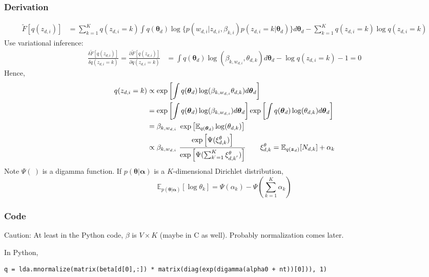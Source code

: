 \documentclass[a4paper,10.5pt,dvipdfmx]{jarticle}  %
\begin{document}
\subsubsection{Derivation}
\begin{align}
	\widetilde{F}[q(z_{d,i})] &= \sum_{k=1}^{K} q(z_{d,i} = k) \int q(\boldsymbol{\theta}_d) \log \{ p(w_{d,i} | z_{d,i}, \beta_{k,i}) p(z_{d,i} = k | \boldsymbol{\theta}_d) \} d \boldsymbol{\theta}_d - \sum_{k=1}^{K} q(z_{d,i}=k) \log q(z_{d,i}=k)
\end{align}
Use variational inference:
\begin{align}
	\frac{\delta \widetilde{F}[q(z_{d,i})]}{\delta q(z_{d,i} = k)} = \frac{\partial \widetilde{F}[q(z_{d,i})]}{\partial q(z_{d,i} = k)} &= \int q(\boldsymbol{\theta}_d) \log(\beta_{k, w_{d,i}}, \theta_{d,k}) d \boldsymbol{\theta}_d - \log q(z_{d,i} = k) - 1 = 0
\end{align}
Hence,
\begin{align}
	q(z_{d,i} = k) &\propto \exp \left[ \int q(\boldsymbol{\theta}_d) \log (\beta_{k, w_{d,i}} \theta_{d,k}) d \boldsymbol{\theta}_d \right] \\
&= \exp \left[ \int q (\boldsymbol{\theta}_d) \log(\beta_{k, w_{d,i}}) d \boldsymbol{\theta}_d \right] \exp \left[\int q(\boldsymbol{\theta}_d) \log(\theta_{d,k}) d \boldsymbol{\theta}_d  \right]\\
&= \beta_{k, w_{d,i}} \ \exp \left[ \mathbb{E}_{q(\boldsymbol{\theta}_d)} \log(\theta_{d,k}) \right]\\
&\propto \beta_{k, w_{d,i}} \ \frac{\exp \left[ \Psi( \xi_{d,k}^{\theta}) \right]}{\exp \left[ \Psi( \sum_{k^{`} = 1}^{K} \xi_{d,k^{'}}^{\theta}) \right]} \qquad \xi_{d,k}^{\theta} = \mathbb{E}_{q(\boldsymbol{z}_d)} [N_{d,k}] + \alpha_k \label{Eq:z_q}
\end{align}
Note $\Psi(\ )$ is a digamma function. If $p(\boldsymbol{\theta} | \boldsymbol{\alpha})$ is a $K$-dimensional Dirichlet distribution,$$ \mathbb{E}_{p(\boldsymbol{\theta} | \boldsymbol{\alpha})} [\log \theta_k] = \Psi(\alpha_k) - \Psi \left( \sum_{k=1}^{K} \alpha_k \right) $$

\subsubsection{Code}
\noindent
Caution: At least in the Python code, $\beta$ is $V \times K$ (maybe in C as well). Probably normalization comes later. \par
In Python,
\begin{lstlisting}[style=Python]
q = lda.mnormalize(matrix(beta[d[0],:]) * matrix(diag(exp(digamma(alpha0 + nt))[0])), 1)
\end{lstlisting}
\end{document}
